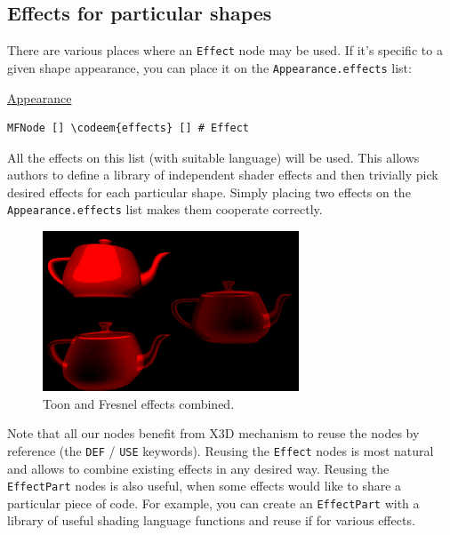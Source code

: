 \documentclass{egpubl}
\newenvironment{mycode}
{\begin{mycodecore}}
{\end{mycodecore}
\vspace{-0.1in}}
\newcommand*{\codeem}[1]{\textbf{#1}}
\begin{document}
\subsection{Effects for particular shapes}

There are various places where an \texttt{Effect} node may be used.
If it's specific to a given shape appearance, you can place it
on the \texttt{Appearance.effects} list:

\begin{mycode}
\underline{Appearance}
\begin{Verbatim}[commandchars=\\\{\},fontsize=\small]
MFNode [] \codeem{effects} [] # Effect
\end{Verbatim}
\end{mycode}

All the effects on this list (with suitable language) will be used.
This allows authors to define a library of independent shader effects
and then trivially pick desired effects for each particular shape.
Simply placing two effects on the \texttt{Appearance.effects} list
makes them cooperate correctly.

\begin{figure}[H]
  \centering
  \includegraphics[width=3in]{fresnel_and_toon}
  \caption{Toon and Fresnel effects combined.}
\end{figure}

Note that all our nodes benefit from X3D mechanism to reuse the nodes
by reference (the \texttt{DEF} / \texttt{USE} keywords). Reusing the
\texttt{Effect} nodes
is most natural and allows to combine existing effects in any desired way.
Reusing the \texttt{EffectPart} nodes is also useful, when some effects
would like to share a particular piece of code. For example,
you can create an \texttt{EffectPart} with a library of useful
shading language functions and reuse if for various effects.
\end{document}
